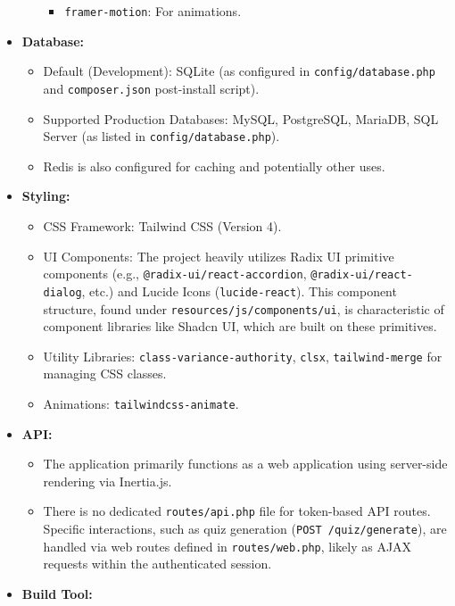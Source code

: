 \begin{itemize}
\begin{itemize}
\begin{itemize}
            \item \texttt{framer-motion}: For animations.
        \end{itemize}
    \end{itemize}
    \item \textbf{Database:}
    \begin{itemize}
        \item Default (Development): SQLite (as configured in \texttt{config/database.php} and \texttt{composer.json} post-install script).
        \item Supported Production Databases: MySQL, PostgreSQL, MariaDB, SQL Server (as listed in \texttt{config/database.php}).
        \item Redis is also configured for caching and potentially other uses.
    \end{itemize}
    \item \textbf{Styling:}
    \begin{itemize}
        \item CSS Framework: Tailwind CSS (Version 4).
        \item UI Components: The project heavily utilizes Radix UI primitive components (e.g., \texttt{@radix-ui/react-accordion}, \texttt{@radix-ui/react-dialog}, etc.) and Lucide Icons (\texttt{lucide-react}). This component structure, found under \texttt{resources/js/components/ui}, is characteristic of component libraries like Shadcn UI, which are built on these primitives.
        \item Utility Libraries: \texttt{class-variance-authority}, \texttt{clsx}, \texttt{tailwind-merge} for managing CSS classes.
        \item Animations: \texttt{tailwindcss-animate}.
    \end{itemize}
    \item \textbf{API:}
    \begin{itemize}
        \item The application primarily functions as a web application using server-side rendering via Inertia.js.
        \item There is no dedicated \texttt{routes/api.php} file for token-based API routes. Specific interactions, such as quiz generation (\texttt{POST /quiz/generate}), are handled via web routes defined in \texttt{routes/web.php}, likely as AJAX requests within the authenticated session.
    \end{itemize}
    \item \textbf{Build Tool:}
    \begin{itemize}

\end{itemize}
\end{itemize}
